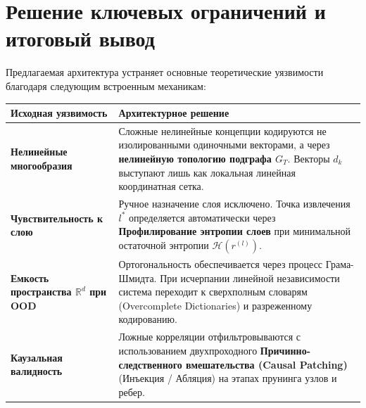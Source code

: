 \documentclass[11pt,a4paper]{article}
\begin{document}
\section{Решение ключевых ограничений и итоговый вывод}

Предлагаемая архитектура устраняет основные теоретические уязвимости благодаря следующим встроенным механикам:

\begin{table}[H]
\centering
\begin{tabular}{p{5cm} p{10cm}}
\toprule
\textbf{Исходная уязвимость} & \textbf{Архитектурное решение} \\
\midrule
\textbf{Нелинейные многообразия} & Сложные нелинейные концепции кодируются не изолированными одиночными векторами, а через \textbf{нелинейную топологию подграфа $G_T$}. Векторы $d_k$ выступают лишь как локальная линейная координатная сетка. \\
\addlinespace
\textbf{Чувствительность к слою} & Ручное назначение слоя исключено. Точка извлечения $l^*$ определяется автоматически через \textbf{Профилирование энтропии слоев} при минимальной остаточной энтропии $\mathcal{H}(r^{(l)})$. \\
\addlinespace
\textbf{Емкость пространства $\mathbb{R}^d$ при OOD} & Ортогональность обеспечивается через процесс Грама-Шмидта. При исчерпании линейной независимости система переходит к сверхполным словарям (Overcomplete Dictionaries) и разреженному кодированию. \\
\addlinespace
\textbf{Каузальная валидность} & Ложные корреляции отфильтровываются с использованием двухпроходного \textbf{Причинно-следственного вмешательства (Causal Patching)} (Инъекция / Абляция) на этапах прунинга узлов и ребер. \\
\bottomrule
\end{tabular}
\end{table}

\end{document}
